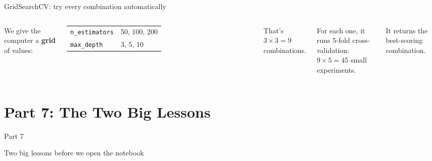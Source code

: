 \documentclass[aspectratio=169, 11pt]{beamer}
\begin{document}
\begin{frame}{GridSearchCV: try every combination automatically}
    \begin{columns}[T]
        We give the computer a \textbf{grid} of values:
        \vspace{0.2cm}

        \begin{tabular}{ll}
        \texttt{n\_estimators} & 50, 100, 200 \\
        \texttt{max\_depth}    & 3, 5, 10 \\
        \end{tabular}

        \vspace{0.3cm}
        That's $3 \times 3 = 9$ combinations.

        \vspace{0.3cm}
        For each one, it runs 5-fold cross-validation:\\
        $9 \times 5 = 45$ small experiments.

        \vspace{0.3cm}
        It returns the best-scoring combination.

        \centering
    \end{columns}
\end{frame}

\section{Part 7: The Two Big Lessons}
\begin{frame}
    \centering
    \Huge \textcolor{ausred}{Part 7}

    \vspace{0.5cm}
    \LARGE Two big lessons before we open the notebook
\end{frame}
\end{document}
